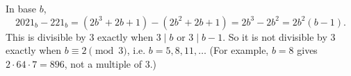 In base $b$,
\[2021_b-221_b=(2b^3+2b+1)-(2b^2+2b+1)=2b^3-2b^2=2b^2(b-1).\]
This is divisible by $3$ exactly when $3\mid b$ or $3\mid b-1$. So it is not divisible by $3$ exactly when $\boxed{b\equiv2\pmod3}$, i.e. $b=5,8,11,\dots$ (For example, $b=8$ gives $2\cdot64\cdot7=896$, not a multiple of $3$.)
